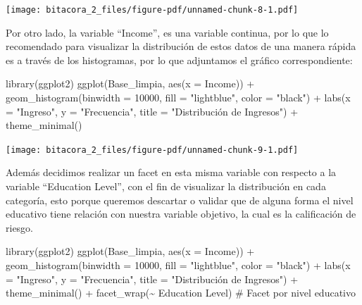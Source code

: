 \documentclass[
  letterpaper,
  DIV=11,
  numbers=noendperiod]{scrreprt}
\newenvironment{Shaded}{\begin{snugshade}}{\end{snugshade}}
\newcommand{\AttributeTok}[1]{\textcolor[rgb]{0.40,0.45,0.13}{#1}}
\newcommand{\CommentTok}[1]{\textcolor[rgb]{0.37,0.37,0.37}{#1}}
\newcommand{\DecValTok}[1]{\textcolor[rgb]{0.68,0.00,0.00}{#1}}
\newcommand{\FunctionTok}[1]{\textcolor[rgb]{0.28,0.35,0.67}{#1}}
\newcommand{\NormalTok}[1]{\textcolor[rgb]{0.00,0.23,0.31}{#1}}
\newcommand{\SpecialCharTok}[1]{\textcolor[rgb]{0.37,0.37,0.37}{#1}}
\newcommand{\StringTok}[1]{\textcolor[rgb]{0.13,0.47,0.30}{#1}}
\begin{document}
\texttt{[image: bitacora\_2\_files/figure-pdf/unnamed-chunk-8-1.pdf]}

Por otro lado, la variable ``Income'', es una variable continua, por lo
que lo recomendado para visualizar la distribución de estos datos de una
manera rápida es a través de los histogramas, por lo que adjuntamos el
gráfico correspondiente:

\begin{Shaded}
\begin{Highlighting}[]
\FunctionTok{library}\NormalTok{(ggplot2)}
\FunctionTok{ggplot}\NormalTok{(Base\_limpia, }\FunctionTok{aes}\NormalTok{(}\AttributeTok{x =}\NormalTok{ Income)) }\SpecialCharTok{+} 
  \FunctionTok{geom\_histogram}\NormalTok{(}\AttributeTok{binwidth =} \DecValTok{10000}\NormalTok{, }\AttributeTok{fill =} \StringTok{"lightblue"}\NormalTok{, }\AttributeTok{color =} \StringTok{"black"}\NormalTok{) }\SpecialCharTok{+} 
  \FunctionTok{labs}\NormalTok{(}\AttributeTok{x =} \StringTok{"Ingreso"}\NormalTok{, }\AttributeTok{y =} \StringTok{"Frecuencia"}\NormalTok{, }\AttributeTok{title =} \StringTok{"Distribución de Ingresos"}\NormalTok{) }\SpecialCharTok{+}
 \FunctionTok{theme\_minimal}\NormalTok{()}
\end{Highlighting}
\end{Shaded}

\texttt{[image: bitacora\_2\_files/figure-pdf/unnamed-chunk-9-1.pdf]}

Además decidimos realizar un facet en esta misma variable con respecto a
la variable ``Education Level'', con el fin de visualizar la
distribución en cada categoría, esto porque queremos descartar o validar
que de alguna forma el nivel educativo tiene relación con nuestra
variable objetivo, la cual es la calificación de riesgo.

\begin{Shaded}
\begin{Highlighting}[]
\FunctionTok{library}\NormalTok{(ggplot2)}
\FunctionTok{ggplot}\NormalTok{(Base\_limpia, }\FunctionTok{aes}\NormalTok{(}\AttributeTok{x =}\NormalTok{ Income)) }\SpecialCharTok{+} 
  \FunctionTok{geom\_histogram}\NormalTok{(}\AttributeTok{binwidth =} \DecValTok{10000}\NormalTok{, }\AttributeTok{fill =} \StringTok{"lightblue"}\NormalTok{, }\AttributeTok{color =} \StringTok{"black"}\NormalTok{) }\SpecialCharTok{+} 
  \FunctionTok{labs}\NormalTok{(}\AttributeTok{x =} \StringTok{"Ingreso"}\NormalTok{, }\AttributeTok{y =} \StringTok{"Frecuencia"}\NormalTok{, }\AttributeTok{title =} \StringTok{"Distribución de Ingresos"}\NormalTok{) }\SpecialCharTok{+} \FunctionTok{theme\_minimal}\NormalTok{() }\SpecialCharTok{+}
  \FunctionTok{facet\_wrap}\NormalTok{(}\SpecialCharTok{\textasciitilde{}} \StringTok{\textasciigrave{}}\AttributeTok{Education Level}\StringTok{\textasciigrave{}}\NormalTok{)  }\CommentTok{\# Facet por nivel educativo}
\end{Highlighting}
\end{Shaded}
\end{document}

